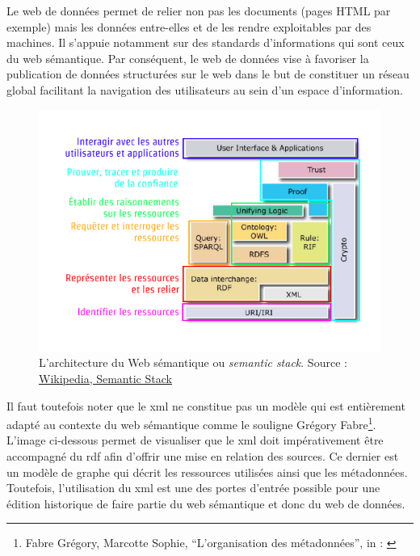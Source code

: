 \documentclass[a4paper, 12pt, twoside]{book}
\begin{document}
Le web de données permet de relier non pas les documents (pages HTML par exemple) mais les données entre-elles et de les rendre exploitables par des machines. Il s'appuie notamment sur des standards d'informations qui sont ceux du web sémantique. Par conséquent, le web de données vise à favoriser la publication de données structurées sur le web dans le but de constituer un réseau global facilitant la navigation des utilisateurs au sein d'un espace d'information. 
\begin{figure}[h]
    \centering
    \includegraphics[scale=0.6]{img/semanticstack.png}
    \caption{L'architecture du Web sémantique ou \textit{semantic stack}. Source : \href{https://fr.wikipedia.org/wiki/Semantic_Web_Stack}{Wikipedia, Semantic Stack}}
    \label{fig:semanticStack}
    \hfill
\end{figure}

Il faut toutefois noter que le \gls{xml} ne constitue pas un modèle qui est entièrement adapté au contexte du web sémantique comme le souligne Grégory Fabre\footnote{Fabre Grégory, Marcotte Sophie, “L’organisation des métadonnées”, in : \cite[chapitre 5]{vitali-rosati_pratiques_2014}}. L'image ci-dessous permet de visualiser que le \gls{xml} doit impérativement être accompagné du \gls{rdf} afin d'offrir une mise en relation des sources. Ce dernier est un modèle de graphe qui décrit les ressources utilisées ainsi que les métadonnées. Toutefois, l'utilisation du \gls{xml} est une des portes d'entrée possible pour une édition historique de faire partie du web sémantique et donc du web de données. 
\end{document}
